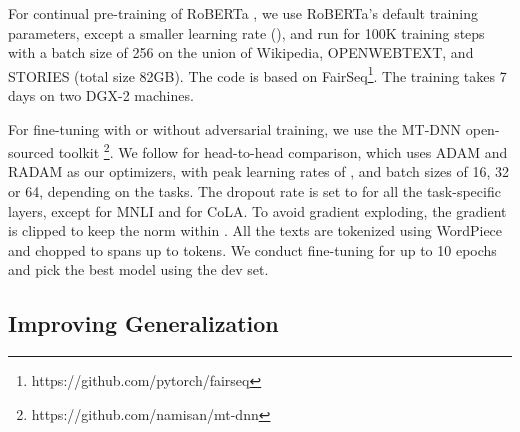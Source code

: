 \documentclass[11pt,a4paper]{article}
\begin{document}
For continual pre-training of RoBERTa \cite{liu2019roberta}, 
we use RoBERTa's default training parameters, except a smaller learning rate (), and run for 100K training steps with a batch size of 256 on the union of Wikipedia, OPENWEBTEXT, and STORIES (total size 82GB). 
The code is based on FairSeq\footnote{https://github.com/pytorch/fairseq}. 
The training takes 7 days on two DGX-2 machines.

For fine-tuning with or without adversarial training,
we use the MT-DNN open-sourced toolkit \cite{liu2020mtmtdnn,liu2015mtl}\footnote{https://github.com/namisan/mt-dnn}. 
We follow \citet{jiang2019smart} for head-to-head comparison, which uses ADAM \cite{kingma2014adam} and RADAM \cite{liu2019radam} as our optimizers, with peak learning rates of , and batch sizes of {16, 32 or 64}, depending on the tasks.  
The dropout rate is set to  for all the task-specific layers, except  for MNLI and  for CoLA. 
To avoid gradient exploding, the gradient is clipped to keep the norm within .  
All the texts are tokenized using WordPiece and chopped to spans up to  tokens. 
We conduct fine-tuning for up to 10 epochs and pick the best model using the dev set.

\subsection{Improving Generalization}
\label{subsec:gen}
\end{document}

